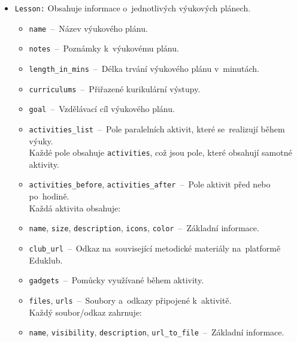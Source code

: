 \documentclass[male,czech,api_bc]{kitheses}
\begin{document}
\begin{itemize}
	\item \texttt{Lesson:} Obsahuje informace o~jednotlivých výukových plánech.
	\begin{itemize}
		\item \texttt{name}~--~Název výukového plánu.
		\item \texttt{notes}~--~Poznámky k~výukovému plánu.
		\item \texttt{length\_in\_mins}~--~Délka trvání výukového plánu v~minutách.
		\item \texttt{curriculums}~--~Přiřazené kurikulární výstupy.
		\item \texttt{goal}~--~Vzdělávací cíl výukového plánu.
		\item \texttt{activities\_list}~--~Pole paralelních aktivit, které se~realizují během výuky.
		\\Každé pole obsahuje \texttt{activities}, což jsou pole, které obsahují samotné aktivity.
		\item \texttt{activities\_before}, \texttt{activities\_after}~--~Pole aktivit před nebo po~hodině.
		\\Každá aktivita obsahuje:
		\item \texttt{name}, \texttt{size}, \texttt{description}, \texttt{icons}, \texttt{color}~--~Základní informace.
		\item \texttt{club\_url}~--~Odkaz na~související metodické materiály na~platformě Eduklub.
		\item \texttt{gadgets}~--~Pomůcky využívané během aktivity.
		\item \texttt{files}, \texttt{urls}~--~Soubory a~odkazy připojené k~aktivitě.
		\\Každý soubor/odkaz zahrnuje:
		\item \texttt{name}, \texttt{visibility}, \texttt{description}, \texttt{url\_to\_file}~--~Základní informace.
	\end{itemize}
\end{itemize}

\newpage
\end{document}
